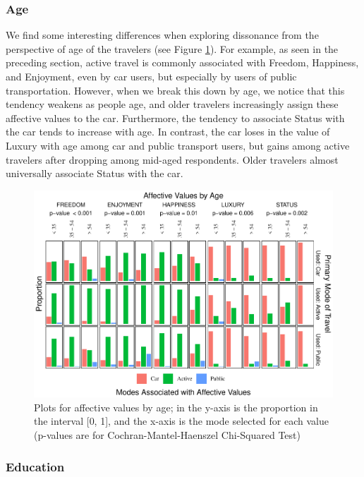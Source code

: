 \documentclass[]{elsarticle} %
\begin{document}
\hypertarget{age-1}{%
\subsubsection{Age}\label{age-1}}

We find some interesting differences when exploring dissonance from the
perspective of age of the travelers (see Figure
\ref{fig:bar-plots-by-age}). For example, as seen in the preceding
section, active travel is commonly associated with Freedom, Happiness,
and Enjoyment, even by car users, but especially by users of public
transportation. However, when we break this down by age, we notice that
this tendency weakens as people age, and older travelers increasingly
assign these affective values to the car. Furthermore, the tendency to
associate Status with the car tends to increase with age. In contrast,
the car loses in the value of Luxury with age among car and public
transport users, but gains among active travelers after dropping among
mid-aged respondents. Older travelers almost universally associate
Status with the car.

\begin{figure}
\centering
\includegraphics{Dissonance_Santiago_v3_files/figure-latex/figure-bar-plots-by-attribute-and-age-1.pdf}
\caption{\label{fig:bar-plots-by-age}Plots for affective values by age;
in the y-axis is the proportion in the interval {[}0, 1{]}, and the
x-axis is the mode selected for each value (p-values are for
Cochran-Mantel-Haenszel Chi-Squared Test)}
\end{figure}

\hypertarget{education-1}{%
\subsubsection{Education}\label{education-1}}
\end{document}
